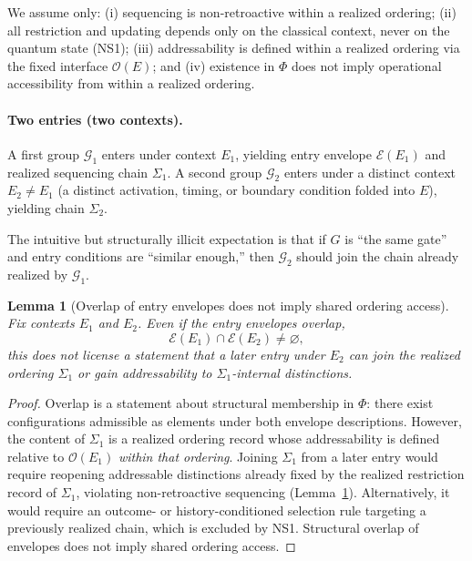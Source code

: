 \documentclass[aps,prx,onecolumn,11pt]{revtex4-2}
\theoremstyle{plain}
\newtheorem{lemma}{Lemma}
\theoremstyle{definition}
\theoremstyle{remark}
\begin{document}
We assume only: (i) sequencing is non-retroactive within a realized
ordering; (ii) all restriction and updating depends only on the
classical context, never on the quantum state (NS1); (iii)
addressability is defined within a realized ordering via the fixed
interface $\mathcal{O}(E)$; and (iv) existence in $\Phi$ does not
imply operational accessibility from within a realized ordering.

\paragraph{Two entries (two contexts).}
A first group $\mathcal{G}_1$ enters under context $E_1$, yielding
entry envelope $\mathcal{E}(E_1)$ and realized sequencing chain
$\Sigma_1$. A second group $\mathcal{G}_2$ enters under a distinct
context $E_2 \neq E_1$ (a distinct activation, timing, or boundary
condition folded into $E$), yielding chain $\Sigma_2$.

The intuitive but structurally illicit expectation is that if $G$ is
``the same gate'' and entry conditions are ``similar enough,'' then
$\mathcal{G}_2$ should join the chain already realized by
$\mathcal{G}_1$.

\begin{lemma}[Overlap of entry envelopes does not imply shared ordering
access]
\label{lem:gate_overlap_no_shared_access}
Fix contexts $E_1$ and $E_2$. Even if the entry envelopes overlap,
\[
\mathcal{E}(E_1) \cap \mathcal{E}(E_2) \neq \varnothing,
\]
this does not license a statement that a later entry under $E_2$ can
join the realized ordering $\Sigma_1$ or gain addressability to
$\Sigma_1$-internal distinctions.
\end{lemma}

\begin{proof}
Overlap is a statement about structural membership in $\Phi$: there
exist configurations admissible as elements under both envelope
descriptions. However, the content of $\Sigma_1$ is a realized
ordering record whose addressability is defined relative to
$\mathcal{O}(E_1)$ \emph{within that ordering}. Joining $\Sigma_1$
from a later entry would require reopening addressable distinctions
already fixed by the realized restriction record of $\Sigma_1$,
violating non-retroactive sequencing
(Lemma~\ref{lem:gate_overlap_no_shared_access}). Alternatively, it would require
an outcome- or history-conditioned selection rule targeting a
previously realized chain, which is excluded by NS1. Structural
overlap of envelopes does not imply shared ordering access.
\qedhere
\end{proof}
\end{document}
